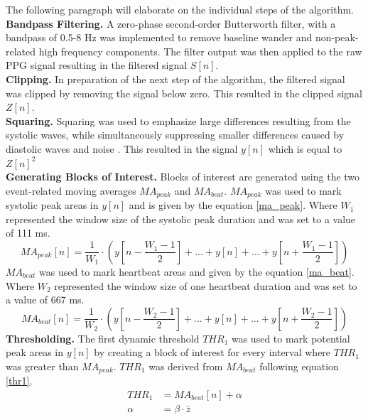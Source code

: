 The following paragraph will elaborate on the individual steps of the algorithm.\\
\textbf{Bandpass Filtering.} A zero-phase second-order Butterworth filter, with a bandpass of 0.5-8 Hz was implemented to remove baseline wander and non-peak-related high frequency components. The filter output was then applied to the raw PPG signal resulting in the filtered signal $S[n]$.\\
\textbf{Clipping.} In preparation of the next step of the algorithm, the filtered signal was clipped by removing the signal below zero. This resulted in the clipped signal $Z[n]$.\\
\textbf{Squaring.} Squaring was used to emphasize large differences resulting from the systolic waves, while simultaneously suppressing smaller differences caused by diastolic waves and noise \cite{Elgendi2013}.
This resulted in the signal $y[n]$ which is equal to $Z[n]^{2}$\\
\textbf{Generating Blocks of Interest.} Blocks of interest are generated using the two event-related moving averages $MA_{peak}$ and $MA_{beat}$. $MA_{peak}$ was used to mark systolic peak areas in $y[n]$ and is given by the equation \ref{ma_peak}. Where $W_{1}$ represented the window size of the systolic peak duration and was set to a value of 111 ms.\\
\begin{equation}\label{ma_peak}
MA_{peak}[n] = \frac{1}{W_{1}}\cdot(y[n-\frac{W_{1}-1}{2}]+...+y[n]+...+y[n+\frac{W_{1}-1}{2}])
\end{equation}
$MA_{beat}$ was used to mark heartbeat areas and given by the equation \ref{ma_beat}. Where $W_{2}$ represented the window size of one heartbeat duration and was set to a value of 667 ms.\\
\begin{equation}\label{ma_beat}
MA_{beat}[n] = \frac{1}{W_{2}}\cdot(y[n-\frac{W_{2}-1}{2}]+...+y[n]+...+y[n+\frac{W_{2}-1}{2}])
\end{equation}
\textbf{Thresholding.} The first dynamic threshold $THR_{1}$ was used to mark potential peak areas in $y[n]$ by creating a block of interest for every interval where $THR_{1}$ was greater than $MA_{peak}$. $THR_{1}$ was derived from $MA_{beat}$ following equation \ref{thr1}.
\begin{align} \label{thr1}
THR_{1} &= MA_{beat}[n]+\alpha \\
\alpha &= \beta\cdot\bar{z}
\end{align}
